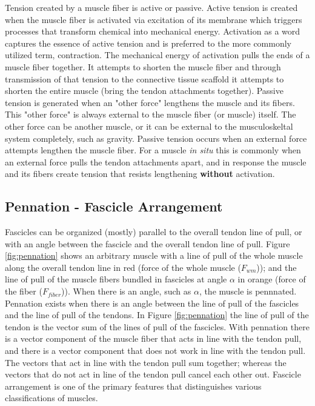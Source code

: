 Tension created by a muscle fiber is active or passive. Active tension is created when the muscle fiber is activated via excitation of its membrane which triggers processes that transform chemical into mechanical energy. Activation as a word captures the essence of active tension and is preferred to the more commonly utilized term, contraction. The mechanical energy of activation pulls the ends of a muscle fiber together. It attempts to shorten the muscle fiber and through transmission of that tension to the connective tissue scaffold it attempts to shorten the entire muscle (bring the tendon attachments together). Passive tension is generated when an "other force" lengthens the muscle and its fibers. This "other force" is always external to the muscle fiber (or muscle) itself. The other force can be another muscle, or it can be external to the musculoskeltal system completely, such as gravity. Passive tension occurs when an external force attempts lengthen the muscle fiber. For a muscle \textit{in situ} this is commonly when an external force pulls the tendon attachments apart, and in response the muscle and its fibers create tension that resists lengthening \textbf{without} activation. 

\subsection{Pennation - Fascicle Arrangement}

Fascicles can be organized (mostly) parallel to the overall tendon line of pull, or with an angle between the fascicle and the overall tendon line of pull. Figure \ref{fig:pennation} shows an arbitrary muscle with a line of pull of the whole muscle along the overall tendon line in red (force of the whole muscle ($F_{wm}$)); and the line of pull of the muscle fibers bundled in fascicles at angle $\alpha$ in orange (force of the fiber ($F_{fiber}$)). When there is an angle, such as $\alpha$, the muscle is pennnated. Pennation exists when there is an angle between the line of pull of the fascicles and the line of pull of the tendons. In Figure \ref{fig:pennation} the line of pull of the tendon is the vector sum of the lines of pull of the fascicles. With pennation there is a vector component of the muscle fiber that acts in line with the tendon pull, and there is a vector component that does not work in line with the tendon pull. The vectors that act in line with the tendon pull sum together; whereas the vectors that do not act in line of the tendon pull cancel each other out. Fascicle arrangement is one of the primary features that distinguishes various classifications of muscles.

